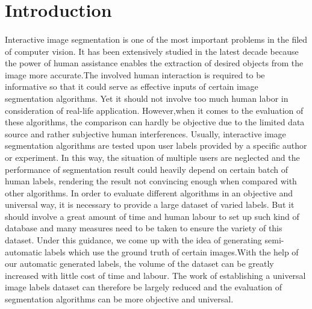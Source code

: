 \documentclass[runningheads,a4paper]{llncs}
\begin{document}
\section{Introduction}

\paragraph{}Interactive image segmentation is one of the most important problems in the filed of computer vision. It has been extensively studied in the latest decade because the power of human assistance enables the extraction of desired objects from the image more accurate.The involved human interaction is required to be informative so that it could serve as effective inputs of certain image segmentation algorithms. Yet it should not involve too much human labor in consideration of real-life application. However,when it comes to the evaluation of these algorithms, the comparison can hardly be objective due to the limited data source and rather subjective human interferences. Usually, interactive image segmentation algorithms are tested upon user labels provided by a specific author or experiment. In this way, the situation of multiple users are neglected and the performance of segmentation result could heavily depend on certain batch of human labels, rendering the result not convincing enough when compared with other algorithms. In order to evaluate different algorithms in an objective and universal way, it is necessary to provide a large dataset of varied labels. But it should involve a great amount of time and human labour to set up such kind of database and many measures need to be taken to ensure the variety of this dataset. Under this guidance, we come up with the idea of generating semi-automatic labels which use the ground truth of certain images.With the help of our automatic generated labels, the volume of the dataset can be greatly increased with little cost of time and labour. The work of establishing a universal image labels dataset can therefore be largely reduced and the evaluation of segmentation algorithms can  be more objective and universal.

\end{document}
